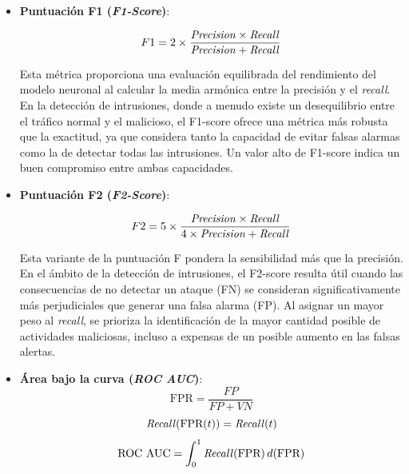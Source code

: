 \begin{itemize}
\item \textbf{Puntuación F1 (\textit{F1-Score})}: \label{met:F1-score}

\begin{equation}
    F1 = 2 \times \frac{\text{\textit{Precision}} \times \text{\textit{Recall}}}{\text{\textit{Precision}} + \text{\textit{Recall}}}
\end{equation}

Esta métrica proporciona una evaluación equilibrada del rendimiento del modelo neuronal al calcular la media armónica entre la precisión y el \textit{recall}. En la detección de intrusiones, donde a menudo existe un desequilibrio entre el tráfico normal y el malicioso, el F1-score ofrece una métrica más robusta que la exactitud, ya que considera tanto la capacidad de evitar falsas alarmas como la de detectar todas las intrusiones. Un valor alto de F1-score indica un buen compromiso entre ambas capacidades.

\item \textbf{Puntuación F2 (\textit{F2-Score})}: \label{met:F2-score}

\begin{equation}
    F2 = 5 \times \frac{\text{\textit{Precision}} \times \text{\textit{Recall}}}{4 \times \text{\textit{Precision}} + \text{\textit{Recall}}}
\end{equation}

Esta variante de la puntuación F pondera la sensibilidad más que la precisión. En el ámbito de la detección de intrusiones, el F2-score resulta útil cuando las consecuencias de no detectar un ataque (FN) se consideran significativamente más perjudiciales que generar una falsa alarma (FP). Al asignar un mayor peso al \textit{recall}, se prioriza la identificación de la mayor cantidad posible de actividades maliciosas, incluso a expensas de un posible aumento en las falsas alertas.


\item \textbf{Área bajo la curva (\textit{ROC AUC})}: \label{met:ROCAUC}
\begin{equation}
    \text{FPR} = \frac{FP}{FP + VN}
\end{equation}
\begin{equation}
    \text{\textit{Recall}}(\text{FPR}(t)) = \text{\textit{Recall}}(t)
\end{equation}
\begin{equation}
    \text{ROC AUC} = \int_{0}^{1} \text{\textit{Recall}}(\text{FPR}) \, d(\text{FPR})
\end{equation}




\end{itemize}
